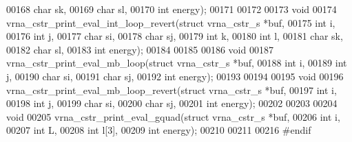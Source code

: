 \begin{DoxyCode}
00168                               \textcolor{keywordtype}{char}                sk,
00169                               \textcolor{keywordtype}{char}                sl,
00170                               \textcolor{keywordtype}{int}                 energy);
00171 
00172 
00173 \textcolor{keywordtype}{void}
00174 vrna\_cstr\_print\_eval\_int\_loop\_revert(\textcolor{keyword}{struct} vrna\_cstr\_s *buf,
00175                                      \textcolor{keywordtype}{int}                i,
00176                                      \textcolor{keywordtype}{int}                j,
00177                                      \textcolor{keywordtype}{char}               si,
00178                                      \textcolor{keywordtype}{char}               sj,
00179                                      \textcolor{keywordtype}{int}                k,
00180                                      \textcolor{keywordtype}{int}                l,
00181                                      \textcolor{keywordtype}{char}               sk,
00182                                      \textcolor{keywordtype}{char}               sl,
00183                                      \textcolor{keywordtype}{int}                energy);
00184 
00185 
00186 \textcolor{keywordtype}{void}
00187 vrna\_cstr\_print\_eval\_mb\_loop(\textcolor{keyword}{struct} vrna\_cstr\_s *buf,
00188                              \textcolor{keywordtype}{int}                i,
00189                              \textcolor{keywordtype}{int}                j,
00190                              \textcolor{keywordtype}{char}               si,
00191                              \textcolor{keywordtype}{char}               sj,
00192                              \textcolor{keywordtype}{int}                energy);
00193 
00194 
00195 \textcolor{keywordtype}{void}
00196 vrna\_cstr\_print\_eval\_mb\_loop\_revert(\textcolor{keyword}{struct} vrna\_cstr\_s  *buf,
00197                                     \textcolor{keywordtype}{int}                 i,
00198                                     \textcolor{keywordtype}{int}                 j,
00199                                     \textcolor{keywordtype}{char}                si,
00200                                     \textcolor{keywordtype}{char}                sj,
00201                                     \textcolor{keywordtype}{int}                 energy);
00202 
00203 
00204 \textcolor{keywordtype}{void}
00205 vrna\_cstr\_print\_eval\_gquad(\textcolor{keyword}{struct} vrna\_cstr\_s *buf,
00206                            \textcolor{keywordtype}{int}                i,
00207                            \textcolor{keywordtype}{int}                L,
00208                            \textcolor{keywordtype}{int}                l[3],
00209                            \textcolor{keywordtype}{int}                energy);
00210 
00211 
00216 \textcolor{preprocessor}{#endif}
\end{DoxyCode}
